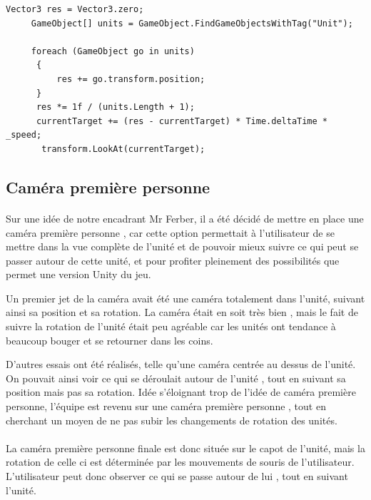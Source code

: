 \documentclass{report}
\begin{document}
\begin{lstlisting}[frame=single]
     Vector3 res = Vector3.zero;
     GameObject[] units = GameObject.FindGameObjectsWithTag("Unit");

     foreach (GameObject go in units)
      {
          res += go.transform.position;
      }
      res *= 1f / (units.Length + 1);
      currentTarget += (res - currentTarget) * Time.deltaTime * _speed;
       transform.LookAt(currentTarget);
\end{lstlisting}

\subsection{Caméra première personne}
\paragraph{}

Sur une idée de notre encadrant Mr Ferber, il a été décidé de mettre en place une caméra première personne , car cette option permettait à l’utilisateur de se mettre dans la vue complète de l’unité et de pouvoir mieux suivre ce qui peut se passer autour de cette unité, et pour profiter pleinement des possibilités que permet une version Unity du jeu. \newline

Un premier jet de la caméra avait été une caméra totalement dans l’unité, suivant ainsi sa position et sa rotation. La caméra était en soit très bien , mais le fait de suivre la rotation de l’unité était peu agréable car les unités ont tendance à beaucoup bouger et se retourner dans les coins. 

D’autres essais ont été réalisés, telle qu’une caméra centrée au dessus de l’unité. On pouvait ainsi voir ce qui se déroulait autour de l’unité , tout en suivant sa position mais pas sa rotation. Idée s’éloignant trop de l’idée de caméra première personne, l’équipe est revenu sur une caméra première personne , tout en cherchant un moyen de ne pas subir les changements de rotation des unités. 
\paragraph{}
La caméra première personne finale est donc située sur le capot de l’unité, mais la rotation de celle ci est déterminée par les mouvements de souris de l’utilisateur. L’utilisateur peut donc observer ce qui se passe autour de lui , tout en suivant l’unité. 
\end{document}

